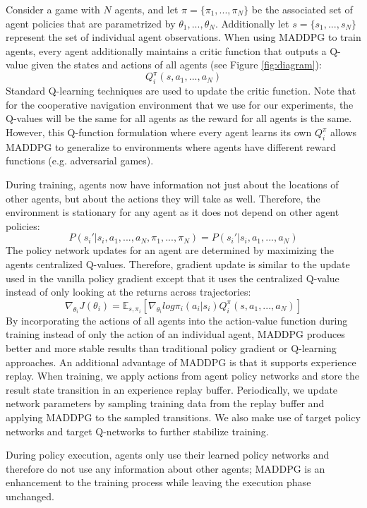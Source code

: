 \documentclass{article}
\begin{document}
Consider a game with $N$ agents, and let $\pi = \{\pi_1, ..., \pi_N\}$ be the associated set of agent policies that are parametrized by $\theta_1, ..., \theta_N$. Additionally let $s = \{s_1, ..., s_N\}$ represent the set of individual agent observations. When using MADDPG to train agents, every agent additionally maintains a critic function that outputs a Q-value given the states and actions of all agents (see Figure \ref{fig:diagram}):
$$Q^\pi_i(s, a_1, ..., a_N)$$
Standard Q-learning techniques are used to update the critic function. Note that for the cooperative navigation environment that we use for our experiments, the Q-values will be the same for all agents as the reward for all agents is the same. However, this Q-function formulation where every agent learns its own $Q^\pi_i$ allows MADDPG to generalize to environments where agents have different reward functions (e.g. adversarial games).

During training, agents now have information not just about the locations of other agents, but about the actions they will take as well. Therefore, the environment is stationary for any agent as it does not depend on other agent policies:
$$P(s_i'|s_i, a_1, ..., a_N, \pi_1, ..., \pi_N) = P(s_i'|s_i, a_1, ..., a_N)$$
The policy network updates for an agent are determined by maximizing the agents centralized Q-values. Therefore, gradient update is similar to the update used in the vanilla policy gradient except that it uses the centralized Q-value instead of only looking at the returns across trajectories:
$$\nabla_{\theta_i}J(\theta_i) = \mathbb{E}_{s, \pi_i}[\nabla_{\theta_i}log \pi_i(a_i|s_i)Q^{\pi}_i(s, a_1, ..., a_N)]$$
By incorporating the actions of all agents into the action-value function during training instead of only the action of an individual agent, MADDPG produces better and more stable results than traditional policy gradient or Q-learning approaches. An additional advantage of MADDPG is that it supports experience replay. When training, we apply  actions from agent policy networks and store the result state transition in an experience replay buffer. Periodically, we update network parameters by sampling training data from the replay buffer and applying MADDPG to the sampled transitions. We also make use of target policy networks and target Q-networks to further stabilize training.

During policy execution, agents only use their learned policy networks and therefore do not use any information about other agents; MADDPG is an enhancement to the training process while leaving the execution phase unchanged.
\end{document}
